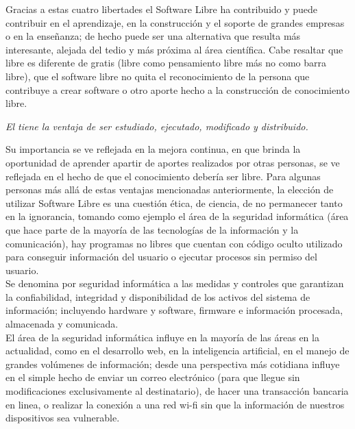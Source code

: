 \begin{multicols}{2}
Gracias a estas cuatro libertades el Software Libre ha contribuido y puede contribuir en el aprendizaje, en la construcción y el soporte de grandes empresas o en la enseñanza; de hecho puede ser una alternativa que resulta más interesante, alejada del tedio y más próxima al área científica. Cabe resaltar que libre es diferente de gratis (libre como pensamiento libre más no como barra libre), que el software libre no quita el reconocimiento de la persona que contribuye a crear software o otro aporte hecho a la construcción de conocimiento libre.

\vspace{0.3cm}

\begin{entradilla}
{\em El {\color{introcolor}{Software Libre}} tiene la ventaja de ser estudiado, ejecutado, modificado y distribuido.}
\end{entradilla}

\vspace{0.3cm}

Su importancia se ve reflejada en la mejora continua, en que brinda la oportunidad de aprender apartir de aportes realizados por otras personas, se ve reflejada en el hecho de que el conocimiento debería ser libre. Para algunas personas más allá de estas ventajas mencionadas anteriormente, la elección de utilizar Software Libre es una cuestión ética, de ciencia, de no permanecer tanto en la ignorancia, tomando como ejemplo el área de la seguridad informática (área que hace parte de la mayoría de las tecnologías de la información y la comunicación), hay programas no libres que cuentan con código oculto utilizado para conseguir información del usuario o ejecutar procesos sin permiso del usuario.\\

Se denomina por seguridad informática a las medidas y controles que garantizan la confiabilidad, integridad y disponibilidad de los activos del sistema de información; incluyendo hardware y software, firmware e información procesada, almacenada y comunicada. \\

El área de la seguridad informática influye en la mayoría de las áreas en la actualidad, como en el desarrollo web, en la inteligencia artificial, en el manejo de grandes volúmenes de información; desde una perspectiva más cotidiana influye en el simple hecho de enviar un correo electrónico (para que llegue sin modificaciones exclusivamente al destinatario), de hacer una transacción bancaria en linea, o realizar la conexión a una red wi-fi sin que la información de nuestros dispositivos sea vulnerable.


\end{multicols}

